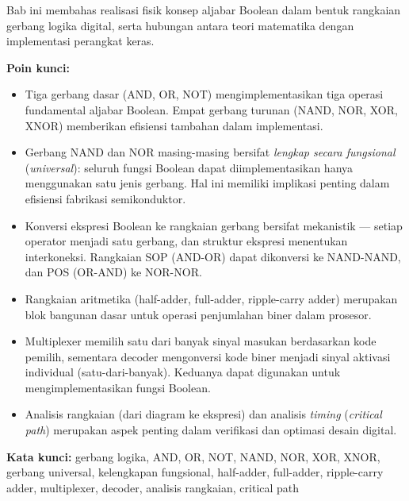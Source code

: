 \documentclass[../main]{subfiles}
\begin{document}
\begin{rangkuman}
Bab ini membahas realisasi fisik konsep aljabar Boolean dalam bentuk rangkaian gerbang logika digital, serta hubungan antara teori matematika dengan implementasi perangkat keras.

\textbf{Poin kunci:}
\begin{itemize}
  \item Tiga gerbang dasar (AND, OR, NOT) mengimplementasikan tiga operasi fundamental aljabar Boolean. Empat gerbang turunan (NAND, NOR, XOR, XNOR) memberikan efisiensi tambahan dalam implementasi.
  \item Gerbang NAND dan NOR masing-masing bersifat \textit{lengkap secara fungsional} (\textit{universal}): seluruh fungsi Boolean dapat diimplementasikan hanya menggunakan satu jenis gerbang. Hal ini memiliki implikasi penting dalam efisiensi fabrikasi semikonduktor.
  \item Konversi ekspresi Boolean ke rangkaian gerbang bersifat mekanistik --- setiap operator menjadi satu gerbang, dan struktur ekspresi menentukan interkoneksi. Rangkaian SOP (AND-OR) dapat dikonversi ke NAND-NAND, dan POS (OR-AND) ke NOR-NOR.
  \item Rangkaian aritmetika (half-adder, full-adder, ripple-carry adder) merupakan blok bangunan dasar untuk operasi penjumlahan biner dalam prosesor.
  \item Multiplexer memilih satu dari banyak sinyal masukan berdasarkan kode pemilih, sementara decoder mengonversi kode biner menjadi sinyal aktivasi individual (satu-dari-banyak). Keduanya dapat digunakan untuk mengimplementasikan fungsi Boolean.
  \item Analisis rangkaian (dari diagram ke ekspresi) dan analisis \textit{timing} (\textit{critical path}) merupakan aspek penting dalam verifikasi dan optimasi desain digital.
\end{itemize}

\textbf{Kata kunci:} gerbang logika, AND, OR, NOT, NAND, NOR, XOR, XNOR, gerbang universal, kelengkapan fungsional, half-adder, full-adder, ripple-carry adder, multiplexer, decoder, analisis rangkaian, critical path
\end{rangkuman}

\ifSubfilesClassLoaded{
  \renewcommand{\bibname}{Daftar Pustaka}
  
  
}{}
\end{document}
